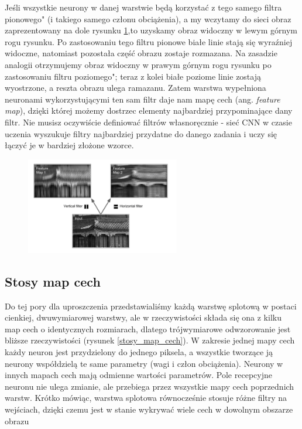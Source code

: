 \documentclass{article}
\begin{document}
Jeśli wszystkie neurony w danej warstwie będą korzystać z tego samego filtra pionowego" (i takiego samego członu obciążenia), a my wczytamy do sieci obraz zaprezentowany na dole rysunku \ref{filters},to uzyskamy obraz widoczny w lewym górnym rogu rysunku. Po zastosowaniu tego filtru pionowe białe linie stają się wyraźniej widoczne, natomiast pozostała część obrazu zostaje rozmazana. Na zasadzie analogii otrzymujemy obraz widoczny w prawym górnym rogu rysunku po zastosowaniu filtru poziomego"; teraz z kolei białe poziome linie zostają wyostrzone, a reszta obrazu ulega ramazanu. Zatem warstwa wypełniona neuronami wykorzystującymi ten sam filtr daje nam mapę cech (ang. \textit{feature map}), dzięki której możemy dostrzec elementy najbardziej przypominające dany filtr. Nie musisz oczywiście definiować filtrów własnoręcznie - sieć CNN w czasie uczenia wyszukuje filtry najbardziej przydatne do danego zadania i uczy się łączyć je w bardziej złożone
wzorce. \cite{geron}
\begin{figure}[H]
	\centering
	\includegraphics[width=0.6\textwidth,keepaspectratio=true]{filters}
	\caption{}
	\label{filters}
\end{figure}

\subsection{Stosy map cech}
Do tej pory dla uproszczenia przedstawialiśmy każdą warstwę splotową w postaci cienkiej, dwuwymiarowej warstwy, ale w rzeczywistości składa się ona z kilku map cech o identycznych rozmiarach, dlatego trójwymiarowe odwzorowanie jest bliższe rzeczywistości (rysunek \ref{stosy_map_cech}). W zakresie jednej mapy cech każdy neuron jest przydzielony do jednego piksela, a wszystkie tworzące ją neurony współdzielą te same parametry (wagi i człon obciążenia). Neurony w innych mapach cech mają odmienne wartości parametrów. Pole recepcyjne neuronu nie ulega zmianie, ale przebiega przez wszystkie mapy cech poprzednich warstw. Krótko mówiąc, warstwa splotowa równocześnie stosuje różne filtry na wejściach, dzięki czemu jest w stanie wykrywać wiele cech w dowolnym obszarze obrazu \cite{geron}
\end{document}
